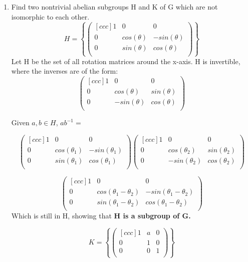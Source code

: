 \begin{enumerate}
\begin{enumerate}
    \item
      Find two nontrivial abelian subgroups H and K of G which are not isomorphic to each other.
      $$
      H = 
      \left \{
      \begin{pmatrix}[ccc]
        1 & 0 & 0 \\
        0 & cos(\theta) & -sin(\theta) \\
        0 & sin(\theta) & cos(\theta) \\
      \end{pmatrix}
      \right \}
      $$
      Let H be the set of all rotation matrices around the x-axis. H is invertible, where the inverses are of the form:
      $$
      \begin{pmatrix}[ccc]
        1 & 0 & 0 \\
        0 & cos(\theta) & sin(\theta) \\
        0 & -sin(\theta) & cos(\theta) \\
      \end{pmatrix}
      $$

      Given $a,b \in H$, $ab^{-1} = $
      
      $$
      \begin{pmatrix}[ccc]
        1 & 0 & 0 \\
        0 & cos(\theta_1) & -sin(\theta_1) \\
        0 & sin(\theta_1) & cos(\theta_1) \\
      \end{pmatrix}
      \begin{pmatrix}[ccc]
        1 & 0 & 0 \\
        0 & cos(\theta_2) & sin(\theta_2)\\
        0 & -sin(\theta_2) & cos(\theta_2)\\
      \end{pmatrix}
      $$

      $$
      \begin{pmatrix}[ccc]
        1 & 0 & 0 \\
        0 & cos(\theta_1-\theta_2) & -sin(\theta_1-\theta_2) \\
        0 & sin(\theta_1-\theta_2) & cos(\theta_1-\theta_2) \\
      \end{pmatrix}
      $$
      Which is still in H, showing that \textbf{H is a subgroup of G.}

      $$
      K = 
      \left \{
      \begin{pmatrix}[ccc]
        1 & a & 0 \\
        0 & 1 & 0 \\
        0 & 0 & 1 \\
      \end{pmatrix}
      \right \}
      $$


\end{enumerate}
\end{enumerate}
